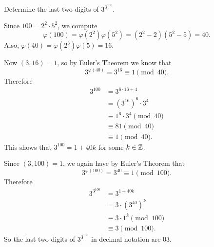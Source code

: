  Determine the last two digits of $3^{3^{100}}$.
\begin{solution}
  Since $100 = 2^2\cdot5^2$, we compute
  \begin{equation*}
    \varphi(100) = \varphi(2^2)\varphi(5^2)
    = (2^2 - 2)(5^2 - 5) = 40.
  \end{equation*}
  Also, $\varphi(40) = \varphi(2^3)\varphi(5) = 16$.

  Now $(3,16) = 1$, so by Euler's Theorem we know that
  \begin{equation*}
    3^{\varphi(40)} = 3^{16}\equiv1\pmod{40}.
  \end{equation*}
  Therefore
  \begin{align*}
    3^{100}
    &= 3^{6\cdot16+4} \\
    &= (3^{16})^6\cdot3^4 \\
    &\equiv 1^6\cdot3^4\pmod{40} \\
    &\equiv 81\pmod{40} \\
    &\equiv 1\pmod{40}.
  \end{align*}
  This shows that $3^{100} = 1 + 40k$ for some $k\in\mathbb{Z}$.

  Since $(3,100) = 1$, we again have by Euler's Theorem that
  \begin{equation*}
    3^{\varphi(100)} = 3^{40}\equiv1\pmod{100}.
  \end{equation*}
  Therefore
  \begin{align*}
    3^{3^{100}}
    &= 3^{1 + 40k} \\
    &= 3\cdot(3^{40})^k \\
    &\equiv 3\cdot1^k\pmod{100} \\
    &\equiv 3\pmod{100}.
  \end{align*}
  So the last two digits of $3^{3^{100}}$ in decimal notation are
  $03$.
\end{solution}
